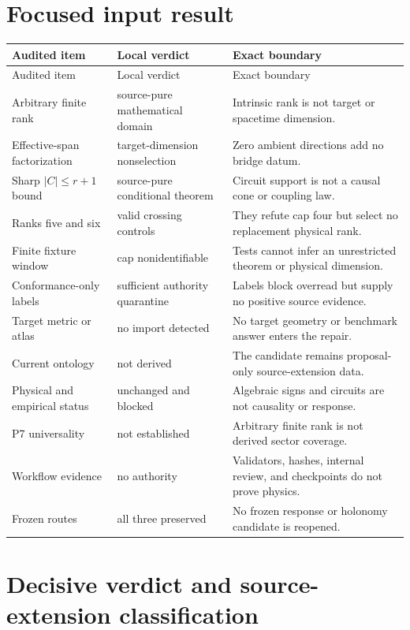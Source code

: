 \documentclass[11pt]{article}
\begin{document}
\section{Focused input result}

\begin{longtable}{p{}p{}p{}}
\toprule
Audited item & Local verdict & Exact boundary \\
\midrule
\endfirsthead
\toprule
Audited item & Local verdict & Exact boundary \\
\midrule
\endhead
Arbitrary finite rank & source-pure mathematical domain & Intrinsic rank is not target or spacetime dimension. \\
Effective-span factorization & target-dimension nonselection & Zero ambient directions add no bridge datum. \\
Sharp $|C|\le r+1$ bound & source-pure conditional theorem & Circuit support is not a causal cone or coupling law. \\
Ranks five and six & valid crossing controls & They refute cap four but select no replacement physical rank. \\
Finite fixture window & cap nonidentifiable & Tests cannot infer an unrestricted theorem or physical dimension. \\
Conformance-only labels & sufficient authority quarantine & Labels block overread but supply no positive source evidence. \\
Target metric or atlas & no import detected & No target geometry or benchmark answer enters the repair. \\
Current ontology & not derived & The candidate remains proposal-only source-extension data. \\
Physical and empirical status & unchanged and blocked & Algebraic signs and circuits are not causality or response. \\
P7 universality & not established & Arbitrary finite rank is not derived sector coverage. \\
Workflow evidence & no authority & Validators, hashes, internal review, and checkpoints do not prove physics. \\
Frozen routes & all three preserved & No frozen response or holonomy candidate is reopened. \\
\bottomrule
\end{longtable}

\section{Decisive verdict and source-extension classification}
\end{document}
